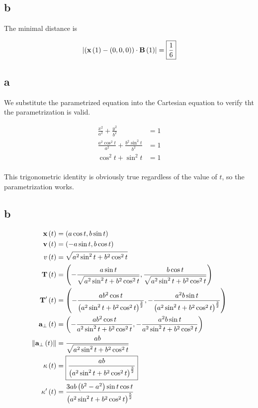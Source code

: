 \documentclass{article}
\begin{document}
\subsection*{b}
The minimal distance is

\begin{align*}
  \left\lvert \left ( \textbf{x} \left ( 1 \right) - \left ( 0, 0, 0 \right) \right) \cdot \textbf{B} \left ( 1 \right) \right\rvert &= \boxed{\frac{1}{6}} \\
\end{align*}



\subsection*{a}

We substitute the parametrized equation into the Cartesian equation to verify tht the parametrization is valid.

\begin{align*}
  \frac{x^2}{a^2} + \frac{y^2}{b^2} &= 1 \\
  \frac{a^2 \cos^2 t}{a^2} + \frac{b^2 \sin^2 t}{b^2} &= 1\\
  \cos^2 t + \sin^2 t &= 1 \\
\end{align*}

This trigonometric identity is obviously true regardless of the value of $t$, so the parametrization works.

\subsection*{b}

\begin{align*}
  \textbf{x} \left ( t \right) &= \left ( a \cos t, b \sin t \right) \\
  \textbf{v} \left ( t \right) &= \left ( - a \sin t, b \cos t \right) \\
  v \left ( t \right) &= \sqrt{a^2 \sin^2 t + b^2 \cos^2 t} \\
  \textbf{T} \left ( t \right) &= \left ( - \frac{a \sin t}{\sqrt{a^2 \sin^2 t + b^2 \cos^2 t}}, \frac{b \cos t}{\sqrt{a^2 \sin^2 t + b^2 \cos^2 t}} \right) \\
  \textbf{T}' \left ( t \right) &= \left ( -\frac{ab^2 \cos t}{\left ( a^2 \sin^2 t + b^2 \cos^2 t \right)^{\frac{3}{2}}}, -\frac{a^2 b \sin t}{\left ( a^2 \sin^2 t + b^2 \cos^2 t \right)^{\frac{3}{2}}} \right) \\
  \textbf{a}_{\perp} \left ( t \right) &= \left ( -\frac{ab^2 \cos t}{a^2 \sin^2 t + b^2 \cos^2 t}, -\frac{a^2 b \sin t}{a^2 \sin^2 t + b^2 \cos^2 t} \right) \\
  \left\lVert\textbf{a}_{\perp} \left ( t \right)\right\rVert &= \frac{ab}{\sqrt{a^2 \sin^2 t + b^2 \cos^2 t}} \\
  \kappa \left ( t \right) &= \boxed{\frac{ab}{\left ( a^2 \sin^2 t + b^2 \cos^2 t \right)^{\frac{3}{2}}}} \\
  \kappa ' \left ( t \right) &= \frac{3ab \left ( b^2 - a^2 \right) \sin t \cos t}{\left ( a^2 \sin^2 t + b^2 \cos^2 t \right)^{\frac{5}{2}}} \\
\end{align*}
\end{document}
